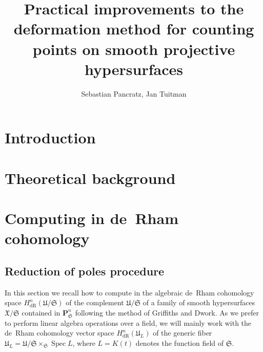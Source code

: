 \documentclass[a4paper,11pt]{article}
\author{Sebastian Pancratz, Jan Tuitman}
\title{Practical improvements to the deformation method for counting points on smooth projective hypersurfaces}
\numberwithin{equation}{section}
\DeclareMathOperator{\Spec}{Spec}        %
\providecommand{\HdR}{H_{\text{dR}}}    %
\theoremstyle{definition}
\begin{document}
\maketitle

\tableofcontents


\section{Introduction}
\label{sec:Introduction}


\section{Theoretical background}
\label{sec:Background}


\section{Computing in de~Rham cohomology}

\subsection{Reduction of poles procedure}
\label{sec:deRham}

In this section we recall how to compute in the algebraic de~Rham 
cohomology space $\HdR^{n}(\mathfrak{U}/\mathfrak{S})$ of the complement 
$\mathfrak{U}/\mathfrak{S}$ of a family of smooth hypersurfaces 
$\mathfrak{X}/\mathfrak{S}$ contained in $\mathbf{P}^n_{\mathfrak{S}}$ 
following the method of Griffiths and Dwork.  As we prefer to perform linear 
algebra operations over a field, we will mainly work with the de~Rham 
cohomology vector space $\HdR^{n}(\mathfrak{U}_L)$ of the generic fiber 
$\mathfrak{U}_L = \mathfrak{U}/\mathfrak{S} \times_{\mathfrak{S}} \Spec{L}$, 
where $L=K(t)$ denotes the function field of $\mathfrak{S}$. 
\end{document}
